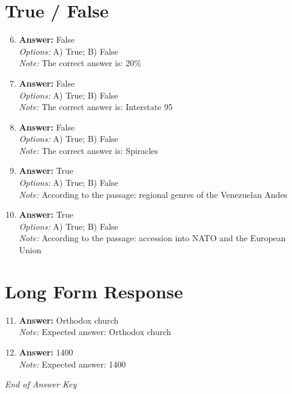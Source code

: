 \documentclass[12pt]{article}
\begin{document}
\section*{True / False}
\begin{enumerate}[label=\arabic*.]
\setcounter{enumi}{5}
\item \textbf{Answer:} False
\\ \textit{Options:} A) True; B) False
\\ \textit{Note:} The correct answer is: 20\%
\item \textbf{Answer:} False
\\ \textit{Options:} A) True; B) False
\\ \textit{Note:} The correct answer is: Interstate 95
\item \textbf{Answer:} False
\\ \textit{Options:} A) True; B) False
\\ \textit{Note:} The correct answer is: Spiracles
\item \textbf{Answer:} True
\\ \textit{Options:} A) True; B) False
\\ \textit{Note:} According to the passage: regional genres of the Venezuelan Andes
\item \textbf{Answer:} True
\\ \textit{Options:} A) True; B) False
\\ \textit{Note:} According to the passage: accession into NATO and the European Union
\end{enumerate}

\section*{Long Form Response}
\begin{enumerate}[label=\arabic*.]
\setcounter{enumi}{10}
\item \textbf{Answer:} Orthodox church
\\ \textit{Note:} Expected answer: Orthodox church
\item \textbf{Answer:} 1400
\\ \textit{Note:} Expected answer: 1400
\end{enumerate}

\vfill
\noindent\textit{End of Answer Key}
\end{document}
